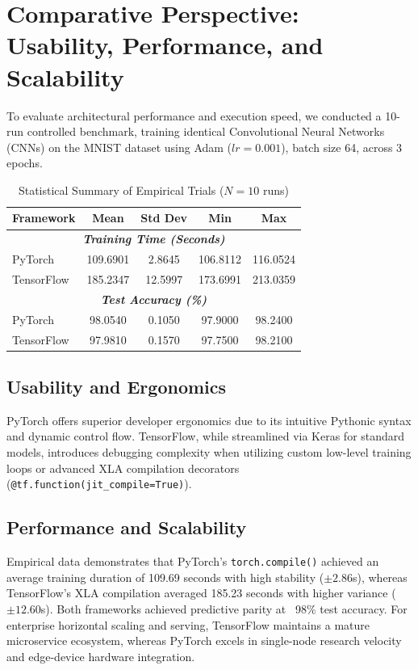 \documentclass[11pt, a4paper]{article}
\begin{document}
\section{Comparative Perspective: Usability, Performance, and Scalability}
To evaluate architectural performance and execution speed, we conducted a 10-run controlled benchmark, training identical Convolutional Neural Networks (CNNs) on the MNIST dataset using Adam ($lr=0.001$), batch size 64, across 3 epochs.

\begin{table}[H]
    \centering
    \caption{Statistical Summary of Empirical Trials ($N=10$ runs)}
    \label{tab:empirical_stats}
    \begin{tabular}{@{}lcccc@{}}
        \toprule
        \textbf{Framework} & \textbf{Mean} & \textbf{Std Dev} & \textbf{Min} & \textbf{Max} \\
        \midrule
        \multicolumn{5}{c}{\textit{\textbf{Training Time (Seconds)}}} \\
        \midrule
        PyTorch    & 109.6901 & 2.8645 & 106.8112 & 116.0524 \\
        TensorFlow & 185.2347 & 12.5997 & 173.6991 & 213.0359 \\
        \midrule
        \multicolumn{5}{c}{\textit{\textbf{Test Accuracy (\%)}}} \\
        \midrule
        PyTorch    & 98.0540 & 0.1050 & 97.9000 & 98.2400 \\
        TensorFlow & 97.9810 & 0.1570 & 97.7500 & 98.2100 \\
        \bottomrule
    \end{tabular}
\end{table}

\subsection{Usability and Ergonomics}
PyTorch offers superior developer ergonomics due to its intuitive Pythonic syntax and dynamic control flow. TensorFlow, while streamlined via Keras for standard models, introduces debugging complexity when utilizing custom low-level training loops or advanced XLA compilation decorators (\texttt{@tf.function(jit\_compile=True)}).

\subsection{Performance and Scalability}
Empirical data demonstrates that PyTorch's \texttt{torch.compile()} achieved an average training duration of 109.69 seconds with high stability ($\pm 2.86$s), whereas TensorFlow's XLA compilation averaged 185.23 seconds with higher variance ($\pm 12.60$s). Both frameworks achieved predictive parity at ~98\% test accuracy. For enterprise horizontal scaling and serving, TensorFlow maintains a mature microservice ecosystem, whereas PyTorch excels in single-node research velocity and edge-device hardware integration.
\end{document}
